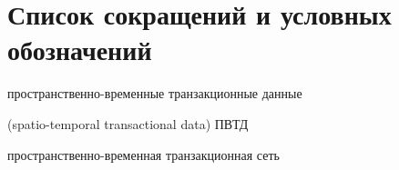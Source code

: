 \chapter*{Список сокращений и условных обозначений} %
\begin{description}[align=right,leftmargin=3.5cm]

\item[ПВТД] пространственно-временные транзакционные данные
\item[STTD] (spatio-temporal transactional data) ПВТД
\item[ПВТС] пространственно-временная транзакционная сеть

\end{description}

